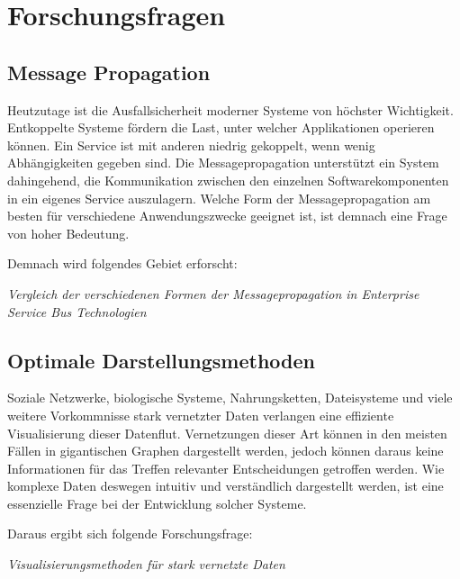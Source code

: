 \section{Forschungsfragen}

\subsection{Message Propagation}

Heutzutage ist die Ausfallsicherheit moderner Systeme von höchster Wichtigkeit. Entkoppelte Systeme fördern die Last, unter welcher Applikationen operieren können. Ein Service ist mit anderen niedrig gekoppelt, wenn wenig Abhängigkeiten gegeben sind. Die Messagepropagation unterstützt ein System dahingehend, die Kommunikation zwischen den einzelnen Softwarekomponenten in ein eigenes Service auszulagern. Welche Form der Messagepropagation am besten für verschiedene Anwendungszwecke geeignet ist, ist demnach eine Frage von hoher Bedeutung.

Demnach wird folgendes Gebiet erforscht:

\textit{Vergleich der verschiedenen Formen der Messagepropagation in Enterprise Service Bus Technologien}

\subsection{Optimale Darstellungsmethoden}

Soziale Netzwerke, biologische Systeme, Nahrungsketten, Dateisysteme und viele weitere Vorkommnisse stark vernetzter Daten verlangen eine effiziente Visualisierung dieser Datenflut. Vernetzungen dieser Art können in den meisten Fällen in gigantischen Graphen dargestellt werden, jedoch können daraus keine Informationen für das Treffen relevanter Entscheidungen getroffen werden. Wie komplexe Daten deswegen intuitiv und verständlich dargestellt werden, ist eine essenzielle Frage bei der Entwicklung solcher Systeme.

Daraus ergibt sich folgende Forschungsfrage:

\textit{Visualisierungsmethoden für stark vernetzte Daten}